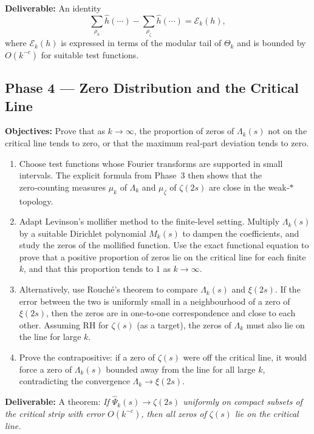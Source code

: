 \documentclass[11pt,a4paper]{article}
\theoremstyle{remark}
\begin{document}
\textbf{Deliverable:} An identity
\[
\sum_{\rho_k} \widehat{h}(\cdots) - \sum_{\rho_\zeta} \widehat{h}(\cdots) = \mathcal{E}_k(h),
\]
where \(\mathcal{E}_k(h)\) is expressed in terms of the modular tail of \(\Theta_k\) and is bounded by \(O(k^{-c})\) for suitable test functions.

\subsection{Phase 4 --- Zero Distribution and the Critical Line}

\textbf{Objectives:} Prove that as \(k\to\infty\), the proportion of zeros of \(\Lambda_k(s)\) not on the critical line tends to zero, or that the maximum real‑part deviation tends to zero.

\begin{enumerate}
\item Choose test functions whose Fourier transforms are supported in small intervals.
  The explicit formula from Phase~3 then shows that the zero‑counting measures \(\mu_k\) of \(\Lambda_k\) and \(\mu_\zeta\) of \(\zeta(2s)\) are close in the weak‑\(*\) topology.
\item Adapt Levinson’s mollifier method \cite{levinson} to the finite‑level setting.
  Multiply \(\Lambda_k(s)\) by a suitable Dirichlet polynomial \(M_k(s)\) to dampen the coefficients, and study the zeros of the mollified function.
  Use the exact functional equation to prove that a positive proportion of zeros lie on the critical line for each finite \(k\), and that this proportion tends to \(1\) as \(k\to\infty\).
\item Alternatively, use Rouché’s theorem to compare \(\Lambda_k(s)\) and \(\xi(2s)\).
  If the error between the two is uniformly small in a neighbourhood of a zero of \(\xi(2s)\), then the zeros are in one‑to‑one correspondence and close to each other.
  Assuming RH for \(\zeta(s)\) (as a target), the zeros of \(\Lambda_k\) must also lie on the line for large \(k\).
\item Prove the contrapositive: if a zero of \(\zeta(s)\) were off the critical line, it would force a zero of \(\Lambda_k(s)\) bounded away from the line for all large \(k\), contradicting the convergence \(\Lambda_k\to\xi(2s)\).
\end{enumerate}

\textbf{Deliverable:} A theorem:
\textit{If \(\widehat{\Psi}_k(s)\to\zeta(2s)\) uniformly on compact subsets of the critical strip with error \(O(k^{-c})\), then all zeros of \(\zeta(s)\) lie on the critical line.}
\end{document}
